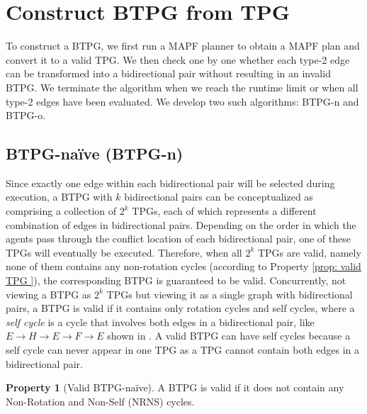 \documentclass[letterpaper]{article} %
\theoremstyle{definition}
\newtheorem{property}{Property}
\begin{document}
\section{Construct BTPG from TPG}
To construct a BTPG, we first run a MAPF planner to obtain a MAPF plan and convert it to a valid TPG. We then check one by one whether each type-2 edge can be transformed into a bidirectional pair without resulting in an invalid BTPG. We terminate the algorithm when we reach the runtime limit or when all type-2 edges have been evaluated. We develop two such algorithms: BTPG-n and BTPG-o.  

\subsection{BTPG-naïve (BTPG-n)}
Since exactly one edge within each bidirectional pair will be selected during execution, a BTPG with $k$ bidirectional pairs can be conceptualized as comprising a collection of $2^k$ TPGs, each of which represents a different combination of edges in bidirectional pairs. Depending on the order in which the agents pass through the conflict location of each bidirectional pair, one of these TPGs will eventually be executed. Therefore, when all $2^k$ TPGs are valid, namely none of them contains any non-rotation cycles (according to Property \ref{prop: valid TPG }), the corresponding BTPG is guaranteed to be valid. Concurrently, not viewing a BTPG as $2^k$ TPGs but viewing it as a single graph with bidirectional pairs, a BTPG is valid if it contains only rotation cycles and self cycles, where a \emph{self cycle} is a cycle that involves both edges in a bidirectional pair, like $E\rightarrow H \rightarrow E \rightarrow F \rightarrow E$ shown in . A valid BTPG can have self cycles because a self cycle can never appear in one TPG as a TPG cannot contain both edges in a bidirectional pair. 

\begin{property}[Valid BTPG-naïve]
\label{prop: valid BTPG - naive}
    A BTPG is valid if it does not contain any Non-Rotation and Non-Self (NRNS) cycles.
\end{property}
\end{document}
